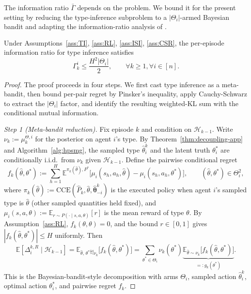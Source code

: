 The information ratio $\bar{\Gamma}$ depends on the problem. We bound it for the present setting by reducing the type-inference subproblem to a $|\Theta_i|$-armed Bayesian bandit and adapting the information-ratio analysis of \citet{russo2016information}.

\begin{lemma}
\label{lem:info-ratio}
Under Assumptions~\ref{ass:TI}, \ref{ass:RL}, \ref{ass:ISI}, \ref{ass:CSR}, the per-episode information ratio for type inference satisfies
\begin{equation}
\Gamma_k^i \leq \frac{H^2 |\Theta_i|}{2}, \qquad \forall k \geq 1, \forall i \in [n].
\end{equation}
\end{lemma}

\begin{proof}
The proof proceeds in four steps. We first cast type inference as a meta-bandit, then bound per-pair regret by Pinsker's inequality, apply Cauchy-Schwarz to extract the $|\Theta_i|$ factor, and identify the resulting weighted-KL sum with the conditional mutual information.

\textit{Step 1 (Meta-bandit reduction).} Fix episode $k$ and condition on $\mathcal{H}_{k-1}$. Write $\nu_k := \mu_k^{\Theta,i}$ for the posterior on agent $i$'s type. By Theorem~\ref{thm:decoupling-app} and Algorithm~\ref{alg:hpsmg}, the sampled type $\hat{\theta}_i^k$ and the latent truth $\theta_i^*$ are conditionally i.i.d.\ from $\nu_k$ given $\mathcal{H}_{k-1}$. Define the pairwise conditional regret
\begin{equation}
\label{eq:fk-def}
f_k(\hat{\theta}, \theta^*) := \sum_{h=1}^H \mathbb{E}^{\pi_k(\hat{\theta}), P^*}\big[\mu_i(s_h, a_h, \hat{\theta}) - \mu_i(s_h, a_h, \theta^*)\big], \qquad (\hat{\theta}, \theta^*) \in \Theta_i^2,
\end{equation}
where $\pi_k(\hat{\theta}) := \mathrm{CCE}(\hat{P}_k, \hat{\theta}, \hat{\boldsymbol{\theta}}_{-i}^k)$ is the executed policy when agent $i$'s sampled type is $\hat{\theta}$ (other sampled quantities held fixed), and $\mu_i(s, a, \theta) := \mathbb{E}_{r \sim P(\cdot \mid s, a, \theta)}[r]$ is the mean reward of type $\theta$. By Assumption~\ref{ass:RL}, $f_k(\theta, \theta) = 0$, and the bound $r \in [0, 1]$ gives $|f_k(\hat{\theta}, \theta^*)| \leq H$ uniformly. Then
\begin{equation}
\label{eq:Delta-as-fk}
\mathbb{E}[\Delta_i^{k,R} \mid \mathcal{H}_{k-1}] = \mathbb{E}_{\hat{\theta},\, \theta^* \overset{\text{iid}}{\sim} \nu_k}\big[f_k(\hat{\theta}, \theta^*)\big] = \sum_{\theta^* \in \Theta_i} \nu_k(\theta^*) \underbrace{\mathbb{E}_{\hat{\theta} \sim \nu_k}\big[f_k(\hat{\theta}, \theta^*)\big]}_{=: g_k(\theta^*)}.
\end{equation}
This is the Bayesian-bandit-style decomposition with arms $\Theta_i$, sampled action $\hat{\theta}_i^k$, optimal action $\theta_i^*$, and pairwise regret $f_k$.


\end{proof}
